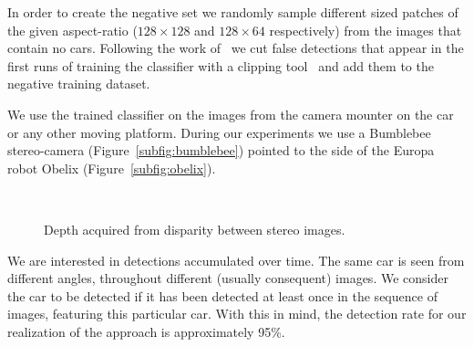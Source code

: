 In order to create the negative set we randomly sample different sized patches
of the given aspect-ratio ($128 \times 128$ and $128 \times 64$ respectively)
from the images that contain no cars. Following the work of~\citet{dalal2005}
we cut false detections that appear in the first runs of training the
classifier with a clipping tool~\cite{imageclipper} and add them to the
negative training dataset.

We use the trained classifier on the images from the camera mounter on the car
or any other moving platform. During our experiments we use a Bumblebee
stereo-camera (Figure~\ref{subfig:bumblebee}) pointed to the side of the
Europa robot Obelix (Figure~\ref{subfig:obelix}).

\begin{figure}[t]%
\centering
{}\hspace{2mm}
\hspace{2mm}
\\
\caption{Depth acquired from disparity between stereo images.}
\label{fig:depth_from_disparity}
\end{figure}

We are interested in detections accumulated over time. The same car is seen
from different angles, throughout different (usually consequent) images. We
consider the car to be detected if it has been detected at least once in the
sequence of images, featuring this particular car. With this in mind, the
detection rate for our realization of the approach is approximately 95\%.

